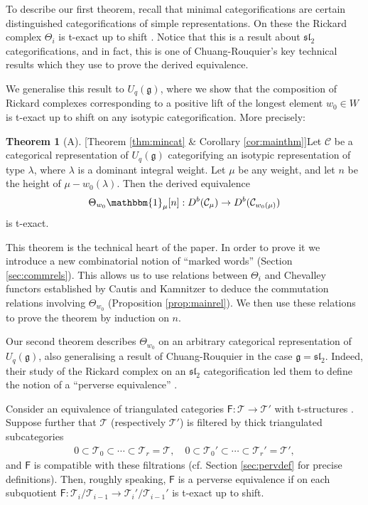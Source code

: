 \documentclass[11pt,reqno]{amsart}
\numberwithin{equation}{section}
\theoremstyle{definition}
\theoremstyle{named}
\newtheorem*{namedtheorem}{Theorem}
\newcommand{\cC}{\mathcal{C}}
\newcommand{\sF}{\mathsf{F}}
\newcommand{\cT}{\mathcal{T}}
\newcommand{\fg}{\mathfrak{g}}
\newcommand{\fsl}{\mathfrak{sl}}
\newcommand{\bone}{\mathbbm{1}}
\begin{document}
To describe our first theorem, recall that minimal categorifications are certain distinguished categorifications of simple representations.  On these the Rickard complex $\Theta_i$  is t-exact up to shift \cite[Theorem 6.6]{CR}.  Notice that this is a result about $\fsl_2$ categorifications, and in fact, this is one of Chuang-Rouquier's key technical results which they use to prove the derived equivalence.  

We generalise this result to $U_q(\fg)$, where we show that the composition of Rickard complexes corresponding to a positive lift of the longest element $w_0 \in W$ is t-exact up to shift on any isotypic categorification.  More precisely:

\begin{namedtheorem}[A][Theorem \ref{thm:mincat} \& Corollary \ref{cor:mainthm}]\label{thm:A}
Let $\cC$ be a categorical representation of $U_q(\fg)$ categorifying an isotypic representation of type $\lambda$, where $\lambda$ is a dominant integral weight.  Let $\mu$ be any weight, and let $n$ be the height of $\mu-w_0(\lambda)$.  Then the derived equivalence
\begin{align*}
\Theta_{w_0}\bone_\mu[n]:D^b(\cC_\mu) \to D^b(\cC_{w_0(\mu)})
\end{align*}
is t-exact.  
\end{namedtheorem}

This theorem is the technical heart of the paper.
In order to prove it we introduce a new combinatorial notion of ``marked words'' (Section \ref{sec:commrels}).  This allows us to use relations between $\Theta_i$ and Chevalley functors established by Cautis and Kamnitzer to deduce  the commutation relations involving $\Theta_{w_0}$ (Proposition \ref{prop:mainrel}).  We then use these relations to prove the theorem by induction on $n$.     

Our second theorem describes $\Theta_{w_0}$ on an arbitrary categorical representation of $U_q(\fg)$, also generalising a result of Chuang-Rouquier in the case $\fg=\fsl_2$.  Indeed, their study of the Rickard complex on an $\fsl_2$ categorification led them to define the notion of a ``perverse equivalence'' \cite{CRperv}.  

Consider an equivalence of triangulated categories $\sF:\cT\to\cT'$ with t-structures \cite{BBD}.  Suppose further that $\cT$ (respectively $\cT'$) is filtered by thick triangulated subcategories 
\begin{align*}
0\subset \cT_0 \subset \cdots \subset \cT_r=\cT, \quad 0\subset \cT_0' \subset \cdots \subset \cT_r'=\cT',
\end{align*}
and $\sF$ is compatible with these filtrations (cf. Section \ref{sec:pervdef} for precise definitions).  Then, roughly speaking,  $\sF$ is a perverse equivalence if on each subquotient $\sF:\cT_i/\cT_{i-1} \to \cT_i'/\cT_{i-1}'$ is t-exact up to shift.  
\end{document}
